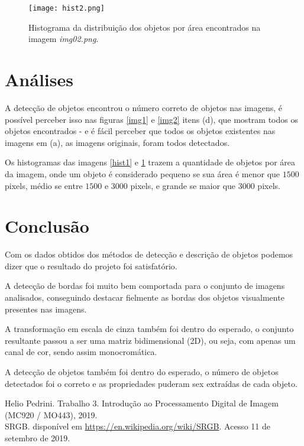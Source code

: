 \documentclass[conference]{IEEEtran}
\begin{document}
    \begin{figure}[ht]
        \centering
        \texttt{[image: hist2.png]}
        \caption{Histograma da distribuição dos objetos por área encontrados na imagem \textit{img02.png}.}
        \label{hist2}
    \end{figure}

\section{Análises}

    A detecção de objetos encontrou o número correto de objetos nas imagens, é possível perceber isso nas figuras \ref{img1} e \ref{img2} itens (d), que mostram todos os objetos encontrados - e é fácil perceber que todos os objetos existentes nas imagens em (a), as imagens originais, foram todos detectados.

    Os histogramas das imagens \ref{hist1} e \ref{hist2} trazem a quantidade de objetos por área da imagem, onde um objeto é considerado pequeno se sua área é menor que $1500$ pixels, médio se entre $1500$ e $3000$ pixels, e grande se maior que $3000$ pixels.


\section{Conclusão}

    Com os dados obtidos dos métodos de detecção e descrição de objetos podemos dizer que o resultado do projeto foi satisfatório.

    A detecção de bordas foi muito bem comportada para o conjunto de imagens analisados, conseguindo destacar fielmente as bordas dos objetos visualmente presentes nas imagens.

    A transformação em escala de cinza também foi dentro do esperado, o conjunto resultante passou a ser uma matriz bidimensional (2D), ou seja, com apenas um canal de cor, sendo assim monocromática.

    A detecção de objetos também foi dentro do esperado, o número de objetos detectados foi o correto e as propriedades puderam sex extraídas de cada objeto.

\begin{thebibliography}{00}

   Helio Pedrini. Trabalho 3. Introdução ao Processamento Digital de Imagem (MC920 / MO443), 2019.\\

   SRGB. disponível em \url{https://en.wikipedia.org/wiki/SRGB}. Acesso 11 de setembro de 2019.

\end{thebibliography}
\end{document}
